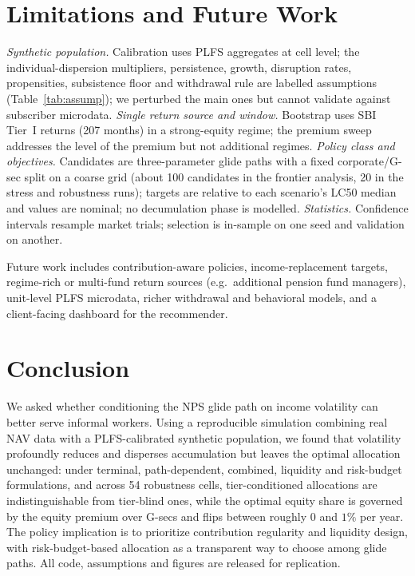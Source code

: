 \documentclass[conference]{IEEEtran}
\begin{document}
\FloatBarrier
\section{Limitations and Future Work}
\emph{Synthetic population.} Calibration uses PLFS aggregates at cell level; the individual-dispersion multipliers, persistence, growth, disruption rates, propensities, subsistence floor and withdrawal rule are labelled assumptions (Table~\ref{tab:assump}); we perturbed the main ones but cannot validate against subscriber microdata. \emph{Single return source and window.} Bootstrap uses SBI Tier~I returns (207 months) in a strong-equity regime; the premium sweep addresses the level of the premium but not additional regimes. \emph{Policy class and objectives.} Candidates are three-parameter glide paths with a fixed corporate/G-sec split on a coarse grid (about 100 candidates in the frontier analysis, 20 in the stress and robustness runs); targets are relative to each scenario's LC50 median and values are nominal; no decumulation phase is modelled. \emph{Statistics.} Confidence intervals resample market trials; selection is in-sample on one seed and validation on another.

Future work includes contribution-aware policies, income-replacement targets, regime-rich or multi-fund return sources (e.g.\ additional pension fund managers), unit-level PLFS microdata, richer withdrawal and behavioral models, and a client-facing dashboard for the recommender.

\FloatBarrier
\section{Conclusion}
We asked whether conditioning the NPS glide path on income volatility can better serve informal workers. Using a reproducible simulation combining real NAV data with a PLFS-calibrated synthetic population, we found that volatility profoundly reduces and disperses accumulation but leaves the optimal allocation unchanged: under terminal, path-dependent, combined, liquidity and risk-budget formulations, and across 54 robustness cells, tier-conditioned allocations are indistinguishable from tier-blind ones, while the optimal equity share is governed by the equity premium over G-secs and flips between roughly $0$ and $1\%$ per year. The policy implication is to prioritize contribution regularity and liquidity design, with risk-budget-based allocation as a transparent way to choose among glide paths. All code, assumptions and figures are released for replication.
\end{document}
